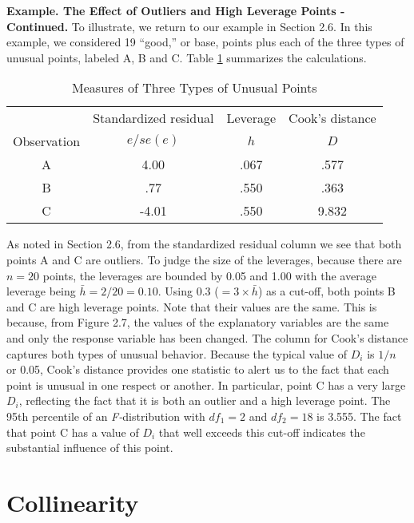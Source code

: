 \linejed

\textbf{Example. The Effect of Outliers and High Leverage Points -
Continued.} To illustrate, we return to our example in Section 2.6.
In this example, we considered 19 ``good,'' or base, points plus
each of the three types of unusual points, labeled A, B and C. Table
\ref{T5:Outliers} summarizes the calculations.

\begin{table}[h]

\caption{\label{T5:Outliers} Measures of Three Types of Unusual
Points}
\begin{tabular}{cccc}
\hline
& Standardized residual & Leverage & Cook's distance \\
Observation & $e/se(e)$ & $h$ & $D$ \\ \hline
A & 4.00 & .067 & .577 \\
 B & .77 & .550 & .363 \\
C & -4.01 & .550 & 9.832 \\ \hline
\end{tabular}
\end{table}

As noted in Section 2.6, from the standardized residual column we
see that both points A and C are outliers. To judge the size of the
leverages, because there are $n=20$ points, the leverages are
bounded by 0.05 and 1.00 with the average leverage being
$\bar{h}=2/20=0.10$. Using 0.3 ($ = 3 \times  \bar{h}$) as a
cut-off, both points B and C are high leverage points. Note that
their values are the same. This is because, from Figure 2.7, the
values of the explanatory variables are the same and only the
response variable has been changed. The column for Cook's distance
captures both types of unusual behavior. Because the typical value
of $D_{i}$ is $1/n$ or 0.05, Cook's distance provides one statistic
to alert us to the fact that each point is unusual in one respect or
another. In particular, point C has a very large $D_{i}$, reflecting
the fact that it is both an outlier and a high leverage point. The
95th percentile of an \textit{F-}distribution with $df_{1}=2$ and
$df_{2}=18$ is 3.555. The fact that point C has a value of $D_{i}$
that well exceeds this cut-off indicates the substantial influence
of this point.

\linejed

\section{Collinearity}

